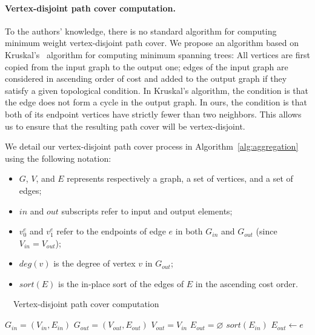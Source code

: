 \documentclass[review]{acmsiggraph}
\begin{document}
\paragraph*{Vertex-disjoint path cover computation.}

To the authors' knowledge, there is no standard algorithm for computing minimum weight vertex-disjoint path cover. 
We propose an algorithm based on Kruskal's~ algorithm for computing minimum spanning trees:
All vertices are first copied from the input graph to the output one;
edges of the input graph are considered in ascending order of cost and added to the output graph if they satisfy a given topological condition.
In Kruskal's algorithm, the condition is that the edge does not form a cycle in the output graph.
In ours, the condition is that both of its endpoint vertices have strictly fewer than two neighbors.
This allows us to ensure that the resulting path cover will be vertex-disjoint. 

We detail our vertex-disjoint path cover process in Algorithm~\ref{alg:aggregation} using the following notation:
\begin{itemize}
  \item $G$, $V$, and $E$ represents respectively a graph, a set of vertices, and a set of edges;
  \item $in$ and $out$ subscripts refer to input and output elements;
  \item $v^e_0$ and $v^e_1$ refer to the endpoints of edge $e$ in both $G_{in}$ and $G_{out}$ (since $V_{in} = V_{out}$);
  \item $deg(v)$ is the degree of vertex $v$ in $G_{out}$;
  \item $sort(E)$ is the in-place sort of the edges of $E$ in the ascending cost order.
\end{itemize}

\begin{algorithm}
\caption{~~Vertex-disjoint path cover computation} 
\label{alg:aggregation}
\begin{algorithmic}

\STATE $ G_{in}  = ( V_{in},  E_{in}  ) $ 
\STATE $ G_{out} = ( V_{out}, E_{out} ) $ 
\STATE $ V_{out} = V_{in}$ 
\STATE $ E_{out} = \varnothing $
\STATE $ sort(E_{in}) $
  	\STATE $E_{out} \gets e$
  \ENDIF
\ENDFOR

\end{algorithmic}
\end{algorithm} 
\end{document}
